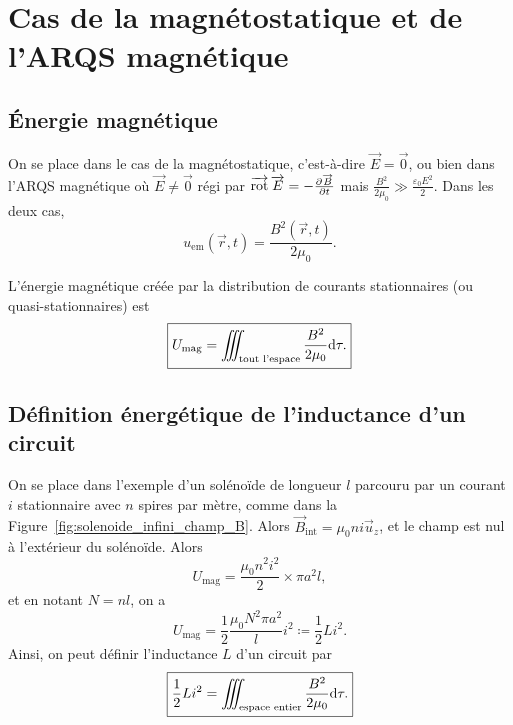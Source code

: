 \section[Cas de la magnétostatique]{Cas de la magnétostatique et de l'ARQS magnétique}
\subsection{Énergie magnétique}

On se place dans le cas de la magnétostatique, c'est-à-dire $\vec{E}=\vec{0}$, ou bien dans l'ARQS magnétique où $\vec{E}\neq\vec{0}$ régi par $\operatorname{\overrightarrow{\text{rot}}}\protect\overrightarrow{{E}}=-\frac{\partial\protect\overrightarrow{{B}}}{\partial t}$ mais $\frac{B^{2}}{2\mu_0}\gg\frac{\varepsilon_0 E^{2}}{2}$. Dans les deux cas,
\begin{equation*}
    \boxed{
        u_{\mathrm{em}}(\vec{r},t)=\frac{B^{2}(\vec{r},t)}{2\mu_0}.
    }
\end{equation*}

L'énergie magnétique créée par la distribution de courants stationnaires (ou quasi-stationnaires) est
\begin{equation*}
    \boxed{
        U_{\mathrm{mag}}=\iiint_{\text{tout l'espace}}\frac{B^{2}}{2\mu_0}\mathrm{d}\tau.
    }
\end{equation*}

\subsection{Définition énergétique de l'inductance d'un circuit}

On se place dans l'exemple d'un solénoïde de longueur $l$ parcouru par un courant $i$ stationnaire avec $n$ spires par mètre, comme dans la Figure~\ref{fig:solenoide_infini_champ_B}. Alors $\vec{B}_{\mathrm{int}}=\mu_0 ni\vec{u}_z$, et le champ est nul à l'extérieur du solénoïde. Alors
\begin{equation*}
    U_{\mathrm{mag}}=\frac{\mu_0 n^{2}i^{2}}{2}\times\pi a^{2}l,
\end{equation*}
et en notant $N=nl$, on a 
\begin{equation*}
    \boxed{
        U_{\mathrm{mag}}=\frac{1}{2}\frac{\mu_0 N^{2}\pi a^{2}}{l}i^{2}\coloneqq\frac{1}{2}Li^{2}.
    }
\end{equation*}
Ainsi, on peut définir l'inductance $L$ d'un circuit par 
\begin{equation*}
    \boxed{
        \frac{1}{2}Li^{2}=\iiint_{\text{espace entier}}\frac{B^{2}}{2\mu_0}\mathrm{d}\tau.
    }
\end{equation*}